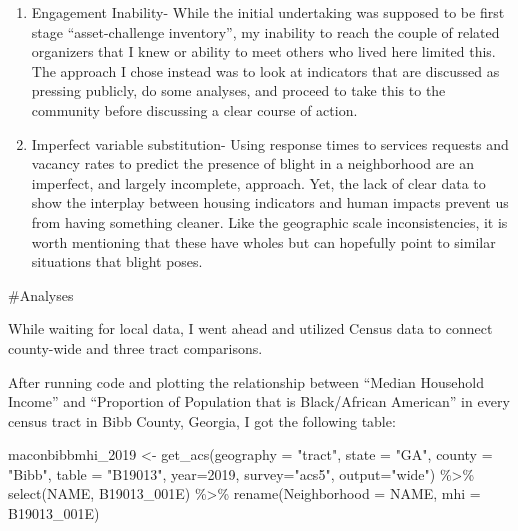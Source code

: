 \documentclass[
]{article}
\newenvironment{Shaded}{\begin{snugshade}}{\end{snugshade}}
\newcommand{\AttributeTok}[1]{\textcolor[rgb]{0.77,0.63,0.00}{#1}}
\newcommand{\DecValTok}[1]{\textcolor[rgb]{0.00,0.00,0.81}{#1}}
\newcommand{\FunctionTok}[1]{\textcolor[rgb]{0.00,0.00,0.00}{#1}}
\newcommand{\NormalTok}[1]{#1}
\newcommand{\OtherTok}[1]{\textcolor[rgb]{0.56,0.35,0.01}{#1}}
\newcommand{\SpecialCharTok}[1]{\textcolor[rgb]{0.00,0.00,0.00}{#1}}
\newcommand{\StringTok}[1]{\textcolor[rgb]{0.31,0.60,0.02}{#1}}
\begin{document}
\begin{enumerate}
\def\labelenumi{\arabic{enumi}.}
\setcounter{enumi}{1}
\item
  Engagement Inability- While the initial undertaking was supposed to be
  first stage ``asset-challenge inventory'', my inability to reach the
  couple of related organizers that I knew or ability to meet others who
  lived here limited this. The approach I chose instead was to look at
  indicators that are discussed as pressing publicly, do some analyses,
  and proceed to take this to the community before discussing a clear
  course of action.
\item
  Imperfect variable substitution- Using response times to services
  requests and vacancy rates to predict the presence of blight in a
  neighborhood are an imperfect, and largely incomplete, approach. Yet,
  the lack of clear data to show the interplay between housing
  indicators and human impacts prevent us from having something cleaner.
  Like the geographic scale inconsistencies, it is worth mentioning that
  these have wholes but can hopefully point to similar situations that
  blight poses.
\end{enumerate}

\#Analyses

While waiting for local data, I went ahead and utilized Census data to
connect county-wide and three tract comparisons.

After running code and plotting the relationship between ``Median
Household Income'' and ``Proportion of Population that is Black/African
American'' in every census tract in Bibb County, Georgia, I got the
following table:

\begin{Shaded}
\begin{Highlighting}[]
\NormalTok{maconbibbmhi\_2019 }\OtherTok{\textless{}{-}} \FunctionTok{get\_acs}\NormalTok{(}\AttributeTok{geography =} \StringTok{"tract"}\NormalTok{, }\AttributeTok{state =} \StringTok{"GA"}\NormalTok{, }\AttributeTok{county =} \StringTok{"Bibb"}\NormalTok{, }\AttributeTok{table =} \StringTok{"B19013"}\NormalTok{, }\AttributeTok{year=}\DecValTok{2019}\NormalTok{, }\AttributeTok{survey=}\StringTok{"acs5"}\NormalTok{, }\AttributeTok{output=}\StringTok{"wide"}\NormalTok{) }\SpecialCharTok{\%\textgreater{}\%}
\FunctionTok{select}\NormalTok{(NAME, B19013\_001E) }\SpecialCharTok{\%\textgreater{}\%}
\FunctionTok{rename}\NormalTok{(}\AttributeTok{Neighborhood =}\NormalTok{ NAME, }\AttributeTok{mhi =}\NormalTok{ B19013\_001E) }
\end{Highlighting}
\end{Shaded}
\end{document}
